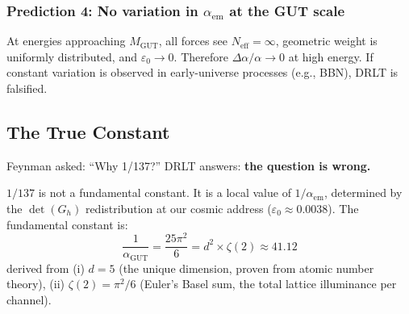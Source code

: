 \documentclass[12pt]{article}
\theoremstyle{remark}
\theoremstyle{definition}
\newcommand{\agut}{\alpha_{\mathrm{GUT}}}
\begin{document}
\subsubsection{Prediction 4: No variation in $\alpha_\text{em}$ at the GUT scale}

At energies approaching $M_\text{GUT}$, all forces see $N_\text{eff} = \infty$, geometric weight is uniformly distributed, and $\varepsilon_0 \to 0$. Therefore $\Delta\alpha/\alpha \to 0$ at high energy. If constant variation is observed in early-universe processes (e.g., BBN), DRLT is falsified.

\subsection{The True Constant}

Feynman asked: ``Why 1/137?'' DRLT answers: \textbf{the question is wrong.}

$1/137$ is not a fundamental constant. It is a local value of $1/\alpha_\text{em}$, determined by the $\det(G_h)$ redistribution at our cosmic address ($\varepsilon_0 \approx 0.0038$). The fundamental constant is:
\begin{equation}
\boxed{\frac{1}{\agut} = \frac{25\pi^2}{6} = d^2 \times \zeta(2) \approx 41.12}
\end{equation}
derived from (i) $d = 5$ (the unique dimension, proven from atomic number theory), (ii) $\zeta(2) = \pi^2/6$ (Euler's Basel sum, the total lattice illuminance per channel).
\end{document}
